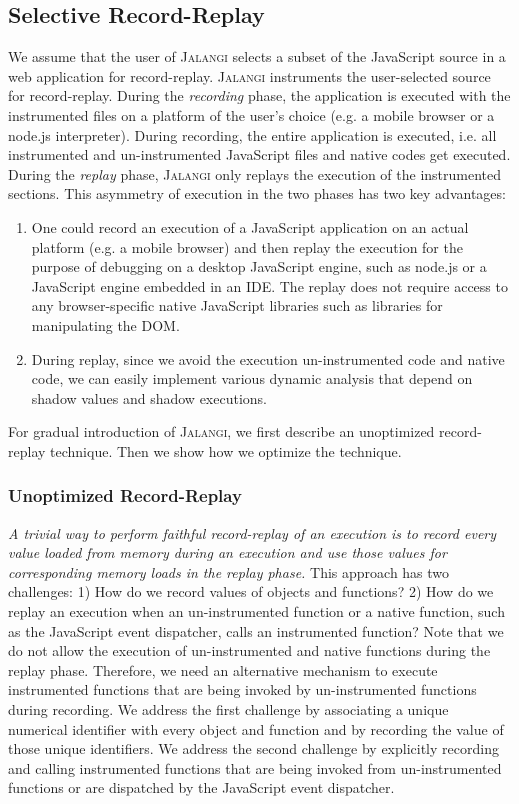 \documentclass{sig-alternate}
\def\jalangi{\textsc{Jalangi}}
\begin{document}
\subsection{Selective Record-Replay}
\label{sec:unopt-select-record}

We assume that the user of \jalangi{} selects a subset of the
JavaScript source in a web application for record-replay.  \jalangi{}
instruments the user-selected source for record-replay.  During the
\emph{recording} phase, the application is executed with the
instrumented files on a platform of the user's choice (e.g. a mobile
browser or a node.js interpreter).  During recording, the entire
application is executed, i.e. all instrumented and un-instrumented
JavaScript files and native codes get executed.  During the
\emph{replay} phase, \jalangi{} only replays the execution of the
instrumented sections.  This asymmetry of execution in the two phases has
two key advantages:
\begin{enumerate}
\item One could record an execution of a JavaScript application on an
  actual platform (e.g. a mobile browser) and then replay the
  execution for the purpose of debugging on a desktop JavaScript
  engine, such as node.js or a JavaScript engine embedded in an IDE.
  The replay does not require access to any browser-specific native
  JavaScript libraries such as libraries for manipulating the DOM.
\item During replay, since we avoid the execution un-instrumented code
  and native code, we can easily implement various dynamic analysis
  that depend on shadow values and shadow executions. 
\end{enumerate}

For gradual introduction of \jalangi{}, we first describe an
unoptimized record-replay technique.  Then we show how we optimize the
technique.  

\subsubsection{Unoptimized Record-Replay}
\label{sec:unopt-record-repl}

\emph{A trivial way to perform faithful record-replay of an execution
  is to record every value loaded from memory during an execution and
  use those values for corresponding memory loads in the replay
  phase.}  This approach has two challenges: 1) How do we record
values of objects and functions?  2) How do we replay an execution
when an un-instrumented function or a native function, such as the
JavaScript event dispatcher, calls an instrumented function?  Note
that we do not allow the execution of un-instrumented and native
functions during the replay phase.  Therefore, we need an alternative
mechanism to execute instrumented functions that are being invoked by
un-instrumented functions during recording.  We address the first
challenge by associating a unique numerical identifier with every
object and function and by recording the value of those unique
identifiers.  We address the second challenge by explicitly recording
and calling instrumented functions that are being invoked from
un-instrumented functions or are dispatched by the JavaScript event
dispatcher.
\end{document}
